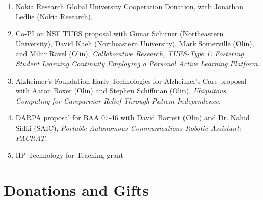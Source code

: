 \documentclass[line]{res}
\begin{document}
\begin{resume}
\begin{enumerate}
		\item Nokia Research Global University Cooperation Donation, with Jonathan Ledlie (Nokia Research).
		
		\item Co-PI on NSF TUES proposal with Gunar Schirner (Northeastern University), David Kaeli (Northeastern University), Mark Somerville (Olin), and Mihir Ravel (Olin), \textit{Collaborative Research, TUES-Type 1: Fostering Student Learning Continuity Employing a Personal Active Learning Platform}. 

		\item Alzheimer's Foundation Early Technologies for Alzheimer's Care proposal with Aaron Boxer (Olin) and Stephen Schiffman (Olin), \textit{Ubiquitous Computing for Carepartner Relief Through Patient Independence}. 

		\item DARPA proposal for BAA 07-46 with David Barrett (Olin) and Dr. Nahid Sidki (SAIC), \textit{Portable Autonomous Communications Robotic Assistant: PACRAT}. 

		\item HP Technology for Teaching grant 
	\end{enumerate}
	
	\section{\sc Donations and Gifts}
	\begin{enumerate}
		

\end{enumerate}
\end{resume}
\end{document}
